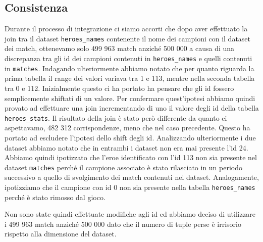 \documentclass[a4paper,12pt,openany,oneside]{book}
\begin{document}
\subsection{Consistenza}
Durante il processo di integrazione ci siamo accorti che dopo aver effettuato la join tra il dataset \verb|heroes_names| contenente il nome dei campioni con il dataset dei match, ottenevamo solo 499 963 match anziché 500 000 a causa di una discrepanza tra gli id dei campioni contenuti in \verb|heroes_names| e quelli contenuti in \verb|matches|. Indagando ulteriormente abbiamo notato che per quanto riguarda la prima tabella il range dei valori variava tra 1 e 113, mentre nella seconda tabella tra 0 e 112. Inizialmente questo ci ha portato ha pensare che gli id fossero semplicemente shiftati di un valore. Per confermare quest'ipotesi abbiamo quindi provato ad effettuare una join incrementando di uno il valore degli id della tabella \verb|heroes_stats|. Il risultato della join è stato però differente da quanto ci aspettavamo, 482 312 corrispondenze, meno che nel caso precedente. Questo ha portato ad escludere l'ipotesi dello shift degli id. Analizzando ulteriormente i due dataset abbiamo notato che in entrambi i dataset non era mai presente l'id 24. Abbiamo quindi ipotizzato che l'eroe identificato con l'id 113 non sia presente nel dataset \verb|matches| perché il campione associato è stato rilasciato in un periodo successivo a quello di svolgimento dei match contenuti nel dataset. Analogamente, ipotizziamo che il campione con id 0 non sia presente nella tabella \verb|heroes_names| perché è stato rimosso dal gioco.

Non sono state quindi effettuate modifiche agli id ed abbiamo deciso di utilizzare i 499 963 match anziché 500 000 dato che il numero di tuple perse è irrisorio rispetto alla dimensione del dataset.
\end{document}

